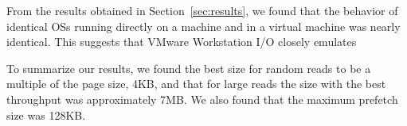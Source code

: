 From the results obtained in Section~\ref{sec:results}, we found that the behavior
of identical OSs running directly on a machine and in a virtual machine was 
nearly identical. This suggests that VMware Workstation I/O closely emulates 

To summarize our results, we found the best size for random reads to be a multiple 
of the page size, 4KB, and that for large reads the size with the best throughput
was approximately 7MB. We also found that the maximum prefetch size was 128KB.

